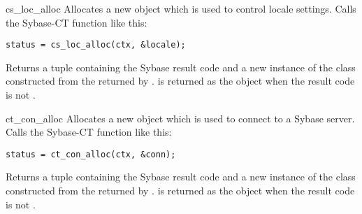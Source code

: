 \begin{methoddesc}[CS_CONTEXT]{cs_loc_alloc}{}
Allocates a new  object which is used to control
locale settings.  Calls the Sybase-CT 
function like this:

\begin{verbatim}
status = cs_loc_alloc(ctx, &locale);
\end{verbatim}

Returns a tuple containing the Sybase result code and a new instance
of the  class constructed from the 
returned by .   is returned as the
 object when the result code is not .
\end{methoddesc}

\begin{methoddesc}[CS_CONTEXT]{ct_con_alloc}{}
Allocates a new  object which is used to connect
to a Sybase server.  Calls the Sybase-CT 
function like this:

\begin{verbatim}
status = ct_con_alloc(ctx, &conn);
\end{verbatim}

Returns a tuple containing the Sybase result code and a new instance
of the  class constructed from the 
returned by .   is returned as the
 object when the result code is not
.
\end{methoddesc}

